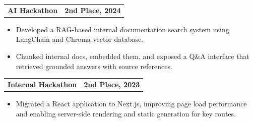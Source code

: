 \documentclass[a4paper,10pt]{article}
\makeatletter
\newcommand{\resumeItem}[1]{\item\small #1}
\newcommand{\resumeProjectHeading}[2]{
  \item[]
  \begin{tabular*}{\textwidth}{l@{\extracolsep{\fill}}r}
    \textbf{#1} & \textbf{\small #2}
  \end{tabular*}\vspace{-4pt}
}
\newcommand{\resumeItemListStart}{\begin{itemize}[leftmargin=14pt,itemsep=1.4pt,topsep=2pt,parsep=0pt]}
\newcommand{\resumeItemListEnd}{\end{itemize}\vspace{1pt}}
\makeatother
\begin{document}
    \resumeProjectHeading{\textbf{AI Hackathon}}{2nd Place, 2024}
  \resumeItemListStart
  \resumeItem{Developed a RAG-based internal documentation search system using LangChain and Chroma vector database.}
    \resumeItem{Chunked internal docs, embedded them, and exposed a Q&A interface that retrieved grounded answers with source references.}

  \resumeItemListEnd
      \resumeProjectHeading{\textbf{Internal Hackathon}}{2nd Place, 2023}
  \resumeItemListStart
  \resumeItem{Migrated a React application to Next.js, improving page load performance and enabling server-side rendering and static generation for key routes.}

  \resumeItemListEnd

  
\end{document}
